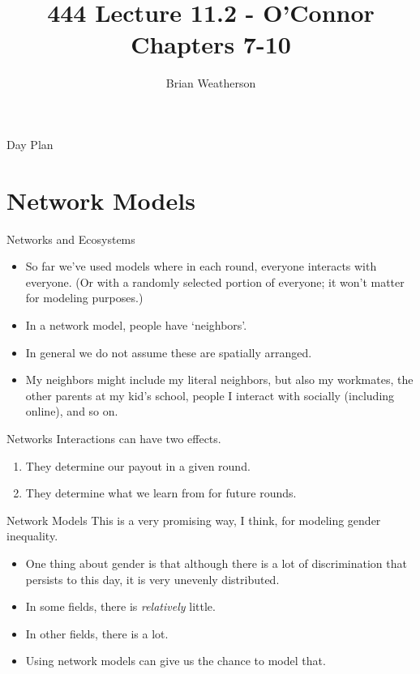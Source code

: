 \documentclass[
  ignorenonframetext,
]{beamer}
\title{444 Lecture 11.2 - O'Connor Chapters 7-10}
\author{Brian Weatherson}
\date{}
\providecommand{\tightlist}{%
  \setlength{\itemsep}{0pt}\setlength{\parskip}{0pt}}
\begin{document}
\frame{\titlepage}

\begin{frame}{Day Plan}
\protect\hypertarget{day-plan}{}
\tableofcontents
\end{frame}

\hypertarget{network-models}{%
\section{Network Models}\label{network-models}}

\begin{frame}{Networks and Ecosystems}
\protect\hypertarget{networks-and-ecosystems}{}
\begin{itemize}
\tightlist
\item
  So far we've used models where in each round, everyone interacts with
  everyone. (Or with a randomly selected portion of everyone; it won't
  matter for modeling purposes.)
\item
  In a network model, people have `neighbors'.
\item
  In general we do not assume these are spatially arranged.
\item
  My neighbors might include my literal neighbors, but also my
  workmates, the other parents at my kid's school, people I interact
  with socially (including online), and so on.
\end{itemize}
\end{frame}

\begin{frame}{Networks}
\protect\hypertarget{networks}{}
Interactions can have two effects.

\begin{enumerate}
\tightlist
\item
  They determine our payout in a given round.
\item
  They determine what we learn from for future rounds.
\end{enumerate}
\end{frame}

\begin{frame}{Network Models}
\protect\hypertarget{network-models-1}{}
This is a very promising way, I think, for modeling gender inequality.

\begin{itemize}
\tightlist
\item
  One thing about gender is that although there is a lot of
  discrimination that persists to this day, it is very unevenly
  distributed.
\item
  In some fields, there is \emph{relatively} little.
\item
  In other fields, there is a lot.
\item
  Using network models can give us the chance to model that.
\end{itemize}
\end{frame}
\end{document}
